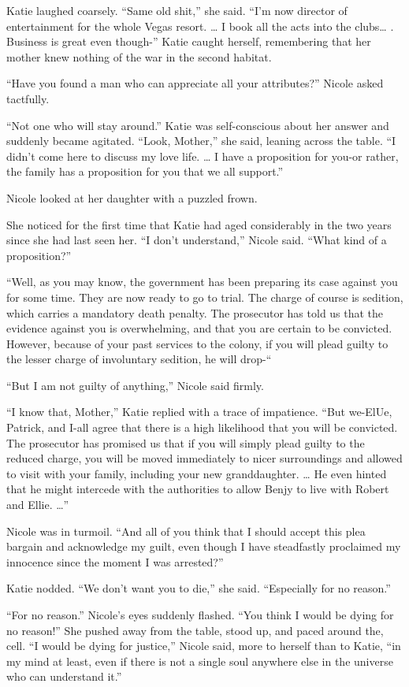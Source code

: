 \documentclass[]{article}
\begin{document}
{{Katie laughed coarsely. “Same old shit,” she said. “I’m now director of entertainment for the whole Vegas resort. … I book all the acts into the clubs… . Business is great even though-” Katie caught herself, remembering that her mother knew nothing of the war in the second habitat.

“Have you found a man who can appreciate all your attributes?” Nicole asked tactfully.

“Not one who will stay around.” Katie was self-conscious about her answer and suddenly became agitated. “Look, Mother,” she said, leaning across the table. “I didn’t come here to discuss my love life. … I have a proposition for you-or rather, the family has a proposition for you that we all support.”

Nicole looked at her daughter with a puzzled frown.

She noticed for the first time that Katie had aged considerably in the two years since she had last seen her. “I don’t understand,” Nicole said. “What kind of a proposition?”

“Well, as you may know, the government has been preparing its case against you for some time. They are now ready to go to trial. The charge of course is sedition, which carries a mandatory death penalty. The prosecutor has told us that the evidence against you is overwhelming, and that you are certain to be convicted. However, because of your past services to the colony, if you will plead guilty to the lesser charge of involuntary sedition, he will drop-“

“But I am not guilty of anything,” Nicole said firmly.

“I know that, Mother,” Katie replied with a trace of impatience. “But we-ElUe, Patrick, and I-all agree that there is a high likelihood that you will be convicted. The prosecutor has promised us that if you will simply plead guilty to the reduced charge, you will be moved immediately to nicer surroundings and allowed to visit with your family, including your new granddaughter. … He even hinted that he might intercede with the authorities to allow Benjy to live with Robert and Ellie. …”

Nicole was in turmoil. “And all of you think that I should accept this plea bargain and acknowledge my guilt, even though I have steadfastly proclaimed my innocence since the moment I was arrested?”

Katie nodded. “We don’t want you to die,” she said. “Especially for no reason.”

“For no reason.” Nicole’s eyes suddenly flashed. “You think I would be dying for no reason!” She pushed away from the table, stood up, and paced around the, cell. “I would be dying for justice,” Nicole said, more to herself than to Katie, “in my mind at least, even if there is not a single soul anywhere else in the universe who can understand it.”

}}
\end{document}
